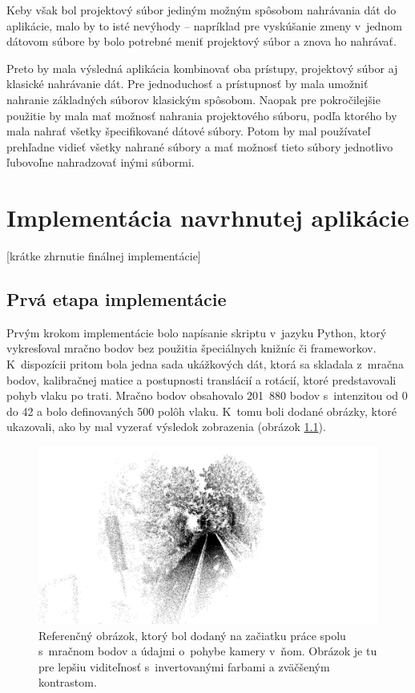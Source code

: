 Keby však bol projektový súbor jediným možným spôsobom nahrávania dát do aplikácie, malo by to isté nevýhody -- napríklad pre vyskúšanie zmeny v~jednom dátovom súbore by bolo potrebné meniť projektový súbor a znova ho nahrávať.

Preto by mala výsledná aplikácia kombinovať oba prístupy, projektový súbor aj klasické nahrávanie dát. Pre jednoduchosť a prístupnosť by mala umožniť nahranie základných súborov klasickým spôsobom. Naopak pre pokročilejšie použitie by mala mať možnosť nahrania projektového súboru, podľa ktorého by mala nahrať všetky špecifikované dátové súbory. Potom by mal používateľ prehľadne vidieť všetky nahrané súbory a mať možnosť tieto súbory jednotlivo ľubovoľne nahradzovať inými súbormi.

\chapter{Implementácia navrhnutej aplikácie}

[krátke zhrnutie finálnej implementácie]

\section{Prvá etapa implementácie}

Prvým krokom implementácie bolo napísanie skriptu v~jazyku Python, ktorý vykresľoval mračno bodov bez použitia špeciálnych knižníc či frameworkov. K~dispozícii pritom bola jedna sada ukážkových dát, ktorá sa skladala z~mračna bodov, kalibračnej matice a postupnosti translácií a rotácií, ktoré predstavovali pohyb vlaku po trati. Mračno bodov obsahovalo 201~880 bodov s~intenzitou od 0 do 42 a bolo definovaných 500 polôh vlaku. K~tomu boli dodané obrázky, ktoré ukazovali, ako by mal vyzerať výsledok zobrazenia (obrázok \ref{fig:referencny-obrazok}).

\begin{figure}[h]
    \centering
    \includegraphics[width=0.95\linewidth]{obrazky-figures/referencny_obrazok.png}
    \caption{Referenčný obrázok, ktorý bol dodaný na začiatku práce spolu s~mračnom bodov a údajmi o~pohybe kamery v~ňom. Obrázok je tu pre lepšiu viditeľnosť s~invertovanými farbami a zväčšeným kontrastom.}
    \label{fig:referencny-obrazok}
\end{figure}

